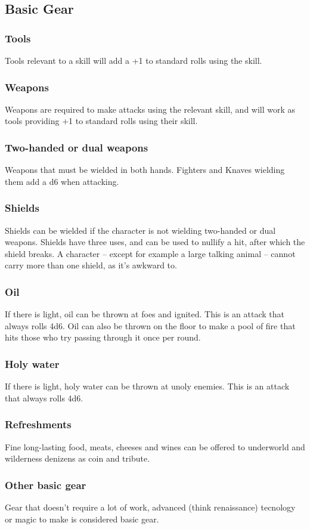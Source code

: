 \subsection{Basic Gear}
\begin{multicols}{2}
\subsubsection*{Tools}
Tools relevant to a skill will add a +1 to standard rolls using the skill.

\subsubsection*{Weapons}
Weapons are required to make attacks using the relevant skill, and will work as tools providing +1 to standard rolls using their skill.

\subsubsection*{Two-handed or dual weapons}
Weapons that must be wielded in both hands. Fighters and Knaves wielding them add a d6 when attacking.

\subsubsection*{Shields}
Shields can be wielded if the character is not wielding two-handed or dual weapons. Shields have three uses, and can be used to nullify a hit, after which the shield breaks. A character -- except for example a large talking animal -- cannot carry more than one shield, as it's awkward to.

\subsubsection*{Oil}
If there is light, oil can be thrown at foes and ignited. This is an attack that always rolls 4d6. Oil can also be thrown on the floor to make a pool of fire that hits those who try passing through it once per round.

\subsubsection*{Holy water}
If there is light, holy water can be thrown at unoly enemies. This is an attack that always rolls 4d6.

\subsubsection*{Refreshments}
Fine long-lasting food, meats, cheeses and wines can be offered to underworld and wilderness denizens as coin and tribute.

\subsubsection*{Other basic gear}
Gear that doesn't require a lot of work, advanced (think renaissance) tecnology or magic to make is considered basic gear.

\end{multicols}

